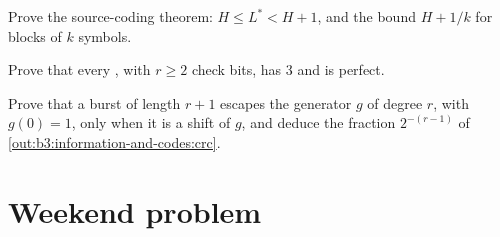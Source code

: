 \begin{exercise}[$\star\star\star$]\label{exo:b3:information-and-codes:10}
Prove the source-coding theorem: $H \le L^* < H + 1$, and the bound $H + 1/k$ for blocks of $k$ symbols.
\end{exercise}

\begin{exercise}[$\star\star\star$]\label{exo:b3:information-and-codes:11}
Prove that every , with $r \ge 2$ check bits, has  3 and is perfect.
\end{exercise}

\begin{exercise}[$\star\star\star$]\label{exo:b3:information-and-codes:12}
Prove that a burst of length $r + 1$ escapes the generator $g$ of degree $r$, with $g(0) = 1$, only when it is a shift of $g$, and deduce the fraction $2^{-(r-1)}$ of \cref{out:b3:information-and-codes:crc}.
\end{exercise}

\section{Weekend problem}\label{sec:b3:information-and-codes:problem}

